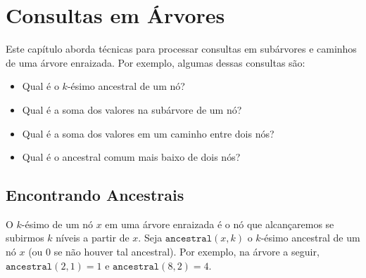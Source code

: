 \chapter{Consultas em Árvores}


Este capítulo aborda técnicas para processar consultas em subárvores e caminhos de uma árvore enraizada. Por exemplo, algumas dessas consultas são:

\begin{itemize}
\item Qual é o $k$-ésimo ancestral de um nó?
\item Qual é a soma dos valores na subárvore de um nó?
\item Qual é a soma dos valores em um caminho entre dois nós?
\item Qual é o ancestral comum mais baixo de dois nós?
\end{itemize}

\section{Encontrando Ancestrais}


O $k$-ésimo  de um nó $x$ em uma árvore enraizada é o nó que alcançaremos se subirmos $k$ níveis a partir de $x$. Seja $\texttt{ancestral}(x,k)$ o $k$-ésimo ancestral de um nó $x$ (ou $0$ se não houver tal ancestral). Por exemplo, na árvore a seguir,
$\texttt{ancestral}(2,1)=1$ e $\texttt{ancestral}(8,2)=4$.

\begin{center}
\end{center}

